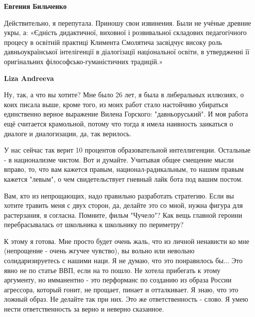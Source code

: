 \begin{itemize}
\begin{itemize}
 
\textbf{Евгения Бильченко} 

Действительно, я перепутала. Приношу свои извинения. Были не учёные древние
укры, а: «Єдність дидактичної, виховної і розвивальної складових педагогічного
процесу в освітній практиці Климента Смолятича засвідчує високу роль
давньоукраїнської інтелігенції в діалогізації національної освіти, в
утвердженні її оригінальних філософсько-гуманістичних традицій.»

 
\textbf{Liza Andreeva} 

Ну, так, а что вы хотите? Мне было 26 лет, я была в либеральных иллюзиях, о
коих писала выше, кроме того, из моих работ стало настойчиво убираться
единственно верное выражение Вилена Горского: "давньоруський". И моя работа ещё
считается крамольной, потому что тогда я имела наивность заикаться о диалоге и
диалогизации, да, так верилось. 

У нас сейчас так верит 10 процентов образовательной интеллигенции. Остальные -
в национализме чистом. Вот и думайте. Учитывая общее смещение мысли вправо, то,
что вам кажется правым, национал-радикальным, то нашим правым кажется "левым",
о чем свидетельствует гневный лайк бота под вашим постом. 

Вам, кто из непрощающих, надо правильно разработать стратегию. Если вы хотите
травить меня с двух сторон, да, делайте это со мной, нужна фигура для
растерзания, я согласна. Помните, фильм "Чучело"?  Как вещь главной героини
перебрасывалась от школьника к школьнику по периметру?

К этому я готова. Мне просто будет очень жаль, что из личной ненависти ко мне
(непрощение - очень жгучее чувство), вы вольно или невольно солидаризируетесь с
нашими наци. Я не думаю, что это понравилось бы... Это явно не по статье ВВП,
если на то пошло. Не хотела прибегать к этому аргументу, но имманентно - это
перформанс по созданию из образа России агрессора, который гонит, не прощает,
пинает и отталкивает. Я знаю, что это ложный образ. Не делайте так при них. Это
же ответственность - слово. Я умею нести ответственность за верно и неверно
сказанное. 


\end{itemize}
\end{itemize}
